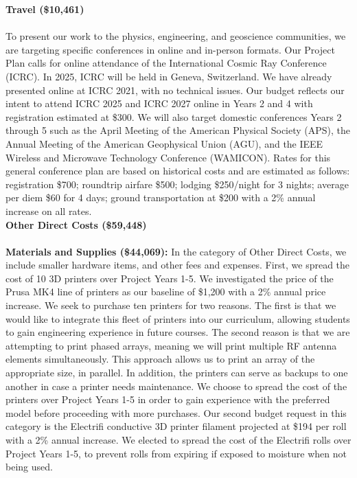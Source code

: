 \documentclass[11pt]{amsart}
\begin{document}
\noindent
\textbf{Travel (\$10,461)} \\ \\
To present our work to the physics, engineering, and geoscience communities, we are targeting specific conferences in online and in-person formats. Our Project Plan calls for online attendance of the International Cosmic Ray Conference (ICRC). In 2025, ICRC will be held in Geneva, Switzerland. We have already presented online at ICRC 2021, with no technical issues. Our budget reflects our intent to attend ICRC 2025 and ICRC 2027 online in Years 2 and 4 with registration estimated at \$300. We will also target domestic conferences Years 2 through 5 such as the April Meeting of the American Physical Society (APS), the Annual Meeting of the American Geophysical Union (AGU), and the IEEE Wireless and Microwave Technology Conference (WAMICON). Rates for this general conference plan are based on historical costs and are estimated as follows: registration \$700; roundtrip airfare \$500; lodging \$250/night for 3 nights; average per diem \$60 for 4 days; ground transportation at \$200 with a 2\% annual increase on all rates. \\

\noindent
\textbf{Other Direct Costs (\$59,448)} \\ \\
\textbf{Materials and Supplies (\$44,069):} In the category of Other Direct Costs, we include smaller hardware items, and other fees and expenses. First, we spread the cost of 10 3D printers over Project Years 1-5. We investigated the price of the Prusa MK4 line of printers as our baseline of \$1,200 with a 2\% annual price increase. We seek to purchase ten printers for two reasons. The first is that we would like to integrate this fleet of printers into our curriculum, allowing students to gain engineering experience in future courses. The second reason is that we are attempting to print phased arrays, meaning we will print multiple RF antenna elements simultaneously. This approach allows us to print an array of the appropriate size, in parallel. In addition, the printers can serve as backups to one another in case a printer needs maintenance. We choose to spread the cost of the printers over Project Years 1-5 in order to gain experience with the preferred model before proceeding with more purchases. Our second budget request in this category is the Electrifi conductive 3D printer filament projected at \$194 per roll with a 2\% annual increase. We elected to spread the cost of the Electrifi rolls over Project Years 1-5, to prevent rolls from expiring if exposed to moisture when not being used. \\
\end{document}
